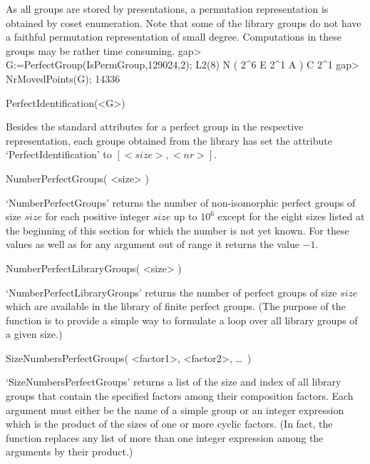 As  all groups are stored  by presentations, a permutation representation
is obtained by coset enumeration. Note that some of the library groups do
not have a   faithful   permutation  representation  of small     degree.
Computations in these groups may be rather time consuming.
\beginexample
    gap> G:=PerfectGroup(IsPermGroup,129024,2);
    L2(8) N ( 2^6 E 2^1 A ) C 2^1
    gap> NrMovedPoints(G);
    14336
\endexample

\>PerfectIdentification(<G>)

Besides the  standard attributes for   a perfect group in the  respective
representation, each  groups  obtained  from   the library has   set  the
attribute `PerfectIdentification' to $[<size>,<nr>]$.

\>NumberPerfectGroups( <size> )

`NumberPerfectGroups' returns the number of non-isomorphic perfect groups
of size $size$ for  each positive integer  $size$ up to $10^6$ except for
the eight  sizes listed at the beginning  of  this section for  which the
number is not yet known. For these values as well as for any argument out
of range it returns the value $-1$.

\>NumberPerfectLibraryGroups( <size> )

`NumberPerfectLibraryGroups' returns the number of perfect groups of size
$size$ which are available in the  library of finite perfect groups. (The
purpose  of the function is  to provide a simple way  to formulate a loop
over all library groups of a given size.)

\>SizeNumbersPerfectGroups( <factor1>, <factor2>, \dots\ )

`SizeNumbersPerfectGroups' returns  a list of the  size and  index of all
library groups that contain the specified factors among their composition
factors. Each argument must either  be the name of a  simple group or  an
integer expression  which is the   product of the sizes   of one or  more
cyclic factors. (In fact, the function replaces any list of more than one
integer expression among the arguments by their product.)

